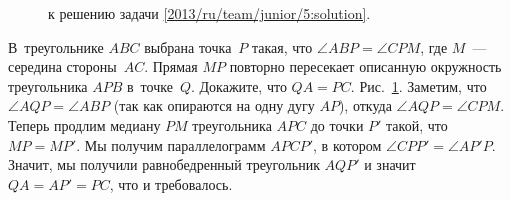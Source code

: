 \ifsolution
\begin{figure}\centering
    \caption{к решению задачи \ref{2013/ru/team/junior/5:solution}.}
    \label{2013/ru/team/junior/5:solution:fig}
\end{figure}%
\fi %

\problem{}
В~треугольнике $ABC$ выбрана точка~$P$ такая, что $\angle ABP = \angle CPM$,
где $M$~--- середина стороны~$AC$.
Прямая $MP$ повторно пересекает описанную окружность треугольника $APB$
в~точке~$Q$.
Докажите, что $QA = PC$.
\solution
\label{2013/ru/team/junior/5:solution}%
Рис.~\ref{2013/ru/team/junior/5:solution:fig}.
Заметим, что $\angle AQP = \angle ABP$ (так как опираются на одну дугу $AP$),
откуда $\angle AQP = \angle CPM$.
Теперь продлим медиану $PM$ треугольника $APC$ до точки $P'$ такой, что
$MP = MP'$.
Мы получим параллелограмм $APCP'$, в котором $\angle CPP' = \angle AP'P$.
Значит, мы получили равнобедренный треугольник $AQP'$ и значит $QA = AP' = PC$,
что и требовалось. 
\endproblem
